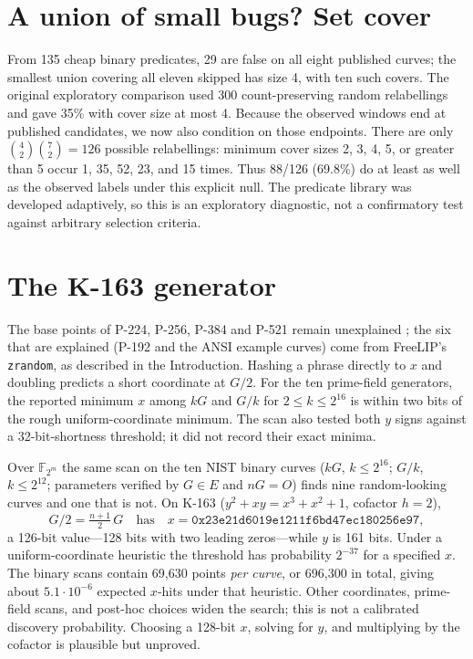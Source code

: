 \documentclass[11pt]{article}
\newcommand{\F}{\mathbb{F}}
\begin{document}
\section{A union of small bugs? Set cover}\label{sec:cover}

From 135 cheap binary predicates, 29 are false on all eight published curves; the smallest union covering all eleven skipped has size 4, with ten such covers. The original exploratory comparison used 300 count-preserving random relabellings and gave 35\% with cover size at most 4. Because the observed windows end at published candidates, we now also condition on those endpoints. There are only $\binom{4}{2}\binom{7}{2}=126$ possible relabellings: minimum cover sizes 2, 3, 4, 5, or greater than 5 occur 1, 35, 52, 23, and 15 times. Thus 88/126 (69.8\%) do at least as well as the observed labels under this explicit null. The predicate library was developed adaptively, so this is an exploratory diagnostic, not a confirmatory test against arbitrary selection criteria.

\section{The K-163 generator}\label{sec:k163}

The base points of P-224, P-256, P-384 and P-521 remain unexplained \cite{anthropic}; the six that are explained (P-192 and the ANSI example curves) come from FreeLIP's \texttt{zrandom}, as described in the Introduction. Hashing a phrase directly to $x$ and doubling predicts a short coordinate at $G/2$. For the ten prime-field generators, the reported minimum $x$ among $kG$ and $G/k$ for $2\le k\le2^{16}$ is within two bits of the rough uniform-coordinate minimum. The scan also tested both $y$ signs against a 32-bit-shortness threshold; it did not record their exact minima.

Over $\F_{2^m}$ the same scan on the ten NIST binary curves ($kG$, $k\le2^{16}$; $G/k$, $k\le2^{12}$; parameters verified by $G\in E$ and $nG=O$) finds nine random-looking curves and one that is not. On K-163 ($y^2+xy=x^3+x^2+1$, cofactor $h=2$),
\[
G/2 = \tfrac{n+1}{2}\,G \quad\text{has}\quad x = \texttt{0x23e21d6019e1211f6bd47ec180256e97},
\]
a 126-bit value---128 bits with two leading zeros---while $y$ is 161 bits. Under a uniform-coordinate heuristic the threshold has probability $2^{-37}$ for a specified $x$. The binary scans contain 69,630 points \emph{per curve}, or 696,300 in total, giving about $5.1\cdot10^{-6}$ expected $x$-hits under that heuristic. Other coordinates, prime-field scans, and post-hoc choices widen the search; this is not a calibrated discovery probability. Choosing a 128-bit $x$, solving for $y$, and multiplying by the cofactor is plausible but unproved.
\end{document}
